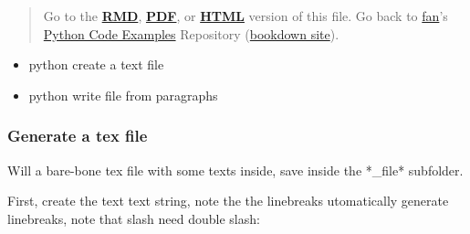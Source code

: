 \documentclass[
]{book}
\providecommand{\tightlist}{%
  \setlength{\itemsep}{0pt}\setlength{\parskip}{0pt}}
\begin{document}
\begin{quote}
Go to the \href{https://github.com/FanWangEcon//pyfan/blob/master/.//A-Collection-of-Python-Examples.Rmd}{\textbf{RMD}}, \href{https://github.com/FanWangEcon//pyfan/blob/master/.//htmlpdfr/A-Collection-of-Python-Examples.pdf}{\textbf{PDF}}, or \href{https://fanwangecon.github.io//pyfan/.//htmlpdfr/A-Collection-of-Python-Examples.html}{\textbf{HTML}} version of this file. Go back to \href{http://fanwangecon.github.io/}{fan}'s \href{https://fanwangecon.github.io/pyfan/}{Python Code Examples} Repository (\href{https://fanwangecon.github.io/pyfan/bookdown}{bookdown site}).
\end{quote}

\begin{itemize}
\tightlist
\item
  python create a text file
\item
  python write file from paragraphs
\end{itemize}

\hypertarget{generate-a-tex-file}{%
\subsubsection{Generate a tex file}\label{generate-a-tex-file}}

Will a bare-bone tex file with some texts inside, save inside the *\_file* subfolder.

First, create the text text string, note the the linebreaks utomatically generate linebreaks, note that slash need double slash:
\end{document}
